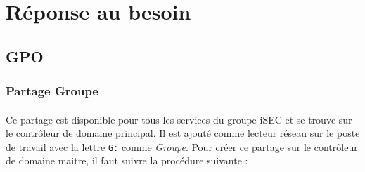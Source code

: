 \section{Réponse au besoin}
	\subsection{GPO}
		\subsubsection{Partage Groupe}
			\paragraph{}
			\label{partage_group}
				Ce partage est disponible pour tous les services du groupe iSEC et se trouve sur le contrôleur de domaine principal. Il est ajouté comme lecteur réseau sur le poste de travail avec la lettre \texttt{G:} comme \textit{Groupe}. Pour créer ce partage sur le contrôleur de domaine maitre, il faut suivre la procédure suivante :

